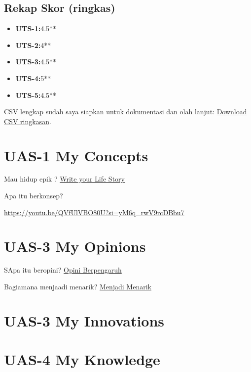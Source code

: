 \documentclass[
  letterpaper,
  DIV=11,
  numbers=noendperiod]{scrreprt}
\providecommand{\tightlist}{%
  \setlength{\itemsep}{0pt}\setlength{\parskip}{0pt}}\usepackage{longtable,booktabs,array}
\begin{document}
\section{Rekap Skor (ringkas)}\label{rekap-skor-ringkas}

\begin{itemize}
\tightlist
\item
  \textbf{UTS-1:}4.5**
\item
  \textbf{UTS-2:}4**
\item
  \textbf{UTS-3:}4.5**
\item
  \textbf{UTS-4:}5**
\item
  \textbf{UTS-5:}4.5**
\end{itemize}

CSV lengkap sudah saya siapkan untuk dokumentasi dan olah lanjut:
\href{sandbox:/mnt/data/UTS_self_assessment.csv}{Download CSV
ringkasan}.


\chapter{UAS-1 My Concepts}\label{uas-1-my-concepts}

Mau hidup epik ? \href{lifestory.pdf}{Write your Life Story}

Apa itu berkonsep?

\url{https://youtu.be/QVfUlVBO80U?si=yM6q_rwV9rcDBbu7}


\chapter{UAS-3 My Opinions}\label{uas-3-my-opinions}

SApa itu beropini? \href{BM\%20Opini.mp4}{Opini Berpengaruh}

Bagiamana menjaadi menarik? \href{./Interesting.mp4}{Menjadi Menarik}


\chapter{UAS-3 My Innovations}\label{uas-3-my-innovations}


\chapter{UAS-4 My Knowledge}\label{uas-4-my-knowledge}
\end{document}
